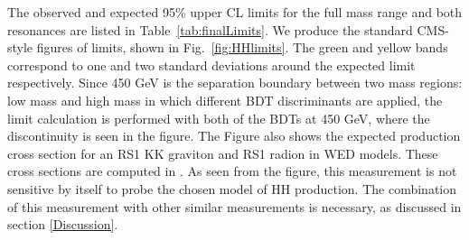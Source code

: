 \begin{small}
The observed and expected 95\% upper CL limits for the full mass range and both resonances are listed in Table~\ref{tab:finalLimits}. We produce the standard CMS-style figures of limits, shown in Fig.~\ref{fig:HHlimits}. The green and yellow bands correspond to one and two standard deviations around the expected limit respectively. Since 450 GeV is the separation boundary between two mass regions: low mass and high mass in which different BDT discriminants are applied, the limit calculation is performed with both of the BDTs at 450 GeV, where the discontinuity is
seen in the figure. The Figure also shows the expected production cross section for an RS1 KK graviton and RS1 radion in WED models. These cross sections are computed in \cite{Oliveira:2014kla}. As seen from the figure, this measurement is not sensitive by itself to probe the chosen model of HH production. The combination of this measurement with other similar measurements is necessary, as discussed in section \ref{Discussion}.


\end{small}
